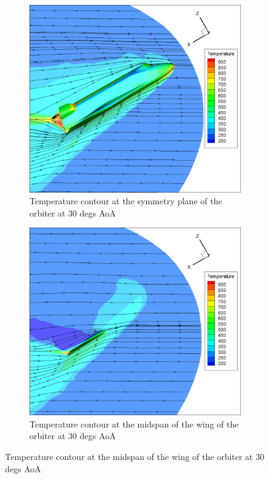 \begin{figure}[H]

	\centering
    \begin{subfigure}[b]{0.65\textwidth}
         \centering
		 \includegraphics[width=\textwidth]{report_images/30_sym_temp_contour.png}
		 \caption{Temperature contour at the symmetry plane of the orbiter at 30 degs AoA}
		 \label{fig: 30_sym_temp_contour}
    \end{subfigure} 
    \begin{subfigure}[b]{0.65\textwidth}
         \centering
		 \includegraphics[width=\textwidth]{report_images/30_wing_temp_contour.png}
		 \caption{Temperature contour at the midspan of the wing of the orbiter at 30 degs AoA}
		 \label{fig: 30_wing_temp_contour}
    \end{subfigure}
\end{figure}

